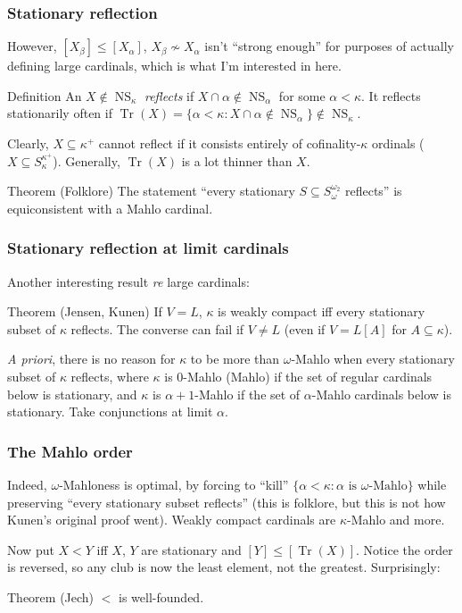\documentclass{beamer}
\newcommand{\NS}{\operatorname{NS}}
\newcommand{\Tr}{\operatorname{Tr}}
\begin{document}
\begin{frame}
\frametitle{Stationary reflection}
However, $[X_\beta] \leq [X_\alpha]$, $X_\beta \not \sim X_\alpha$ isn't ``strong enough'' for purposes of actually \alert{defining} large cardinals, which is what I'm interested in here.

\begin{block}{Definition}
An $X \notin \NS_\kappa$ \emph{reflects} if $X \cap \alpha \notin \NS_\alpha$ for some $\alpha < \kappa$. It reflects stationarily often if $\Tr(X) = \{\alpha < \kappa: X \cap \alpha \notin \NS_\alpha\} \notin \NS_\kappa$.
\end{block}

Clearly, $X \subseteq \kappa^+$ cannot reflect if it consists entirely of cofinality-$\kappa$ ordinals ($X \subseteq S_\kappa^{\kappa^+}$). Generally, $\Tr(X)$ is a lot thinner than $X$. \pause

\begin{block}{Theorem}
(Folklore) The statement ``every stationary $S \subseteq S_\omega^{\omega_2}$ reflects'' is equiconsistent with a Mahlo cardinal.
\end{block}
\end{frame}

\begin{frame}
\frametitle{Stationary reflection at limit cardinals}
Another interesting result \textit{re} large cardinals:

\begin{block}{Theorem}
(Jensen, Kunen) If $V = L$, $\kappa$ is weakly compact iff every stationary subset of $\kappa$ reflects. The converse can fail if $V \neq L$ (even if $V = L[A]$ for $A \subseteq \kappa$).
\end{block}
\pause
\textit{A priori}, there is no reason for $\kappa$ to be more than $\omega$-Mahlo when every stationary subset of $\kappa$ reflects, where $\kappa$ is $0$-Mahlo (Mahlo) if the set of regular cardinals below is stationary, and $\kappa$ is $\alpha + 1$-Mahlo if the set of $\alpha$-Mahlo cardinals below is stationary. Take conjunctions at limit $\alpha$.
\end{frame}

\begin{frame}
\frametitle{The Mahlo order}
Indeed, $\omega$-Mahloness is optimal, by forcing to ``kill'' $\{\alpha < \kappa: \alpha \text{ is } \omega \text{-Mahlo}\}$ while preserving ``every stationary subset reflects'' (this is folklore, but this is not how Kunen's original proof went). Weakly compact cardinals are $\kappa$-Mahlo and more.

Now put $X < Y$ iff $X$, $Y$ are stationary and $[Y] \leq [\Tr(X)]$. Notice the order is reversed, so any club is now the least element, not the greatest. \pause Surprisingly:

\begin{block}{Theorem}
(Jech) $<$ is well-founded.
\end{block}
\end{frame}
\end{document}
